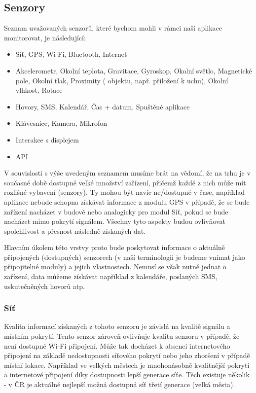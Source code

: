 \documentclass[thesis=M,czech]{FITthesis}[2012/06/26]
\begin{document}
\subsection{Senzory}
Seznam uvažovaných senzorů, které bychom mohli v rámci naší aplikace monitorovat, je následující:

\begin{itemize}
\item    Síť, GPS, Wi-Fi, Bluetooth, Internet
\item    Akcelerometr, Okolní teplota, Gravitace, Gyroskop, Okolní světlo, Magnetické pole, Okolní tlak, Proximity ( objektu, např. přiložení k uchu), Okolní vlhkost, Rotace
\item    Hovory, SMS, Kalendář, Čas + datum, Spuštěné aplikace
\item    Klávesnice, Kamera, Mikrofon
\item    Interakce s displejem
\item    API
\end{itemize}

V souvislosti s výše uvedeným seznamem musíme brát na vědomí, že na trhu je v současné době dostupné velké množství zařízení, přičemž každé z nich může mít rozlišné vybavení (senzory). Ty mohou být navíc ne/dostupné v čase, například aplikace nebude schopna získávat informace z modulu GPS v případě, že se bude zařízení nacházet v budově nebo analogicky pro modul Síť, pokud se bude nacházet mimo pokrytí signálem. Všechny tyto aspekty budou ovlivňovat spolehlivost a přesnost následně získaných dat.

Hlavním úkolem této vrstvy proto bude poskytovat informace o aktuálně připojených (dostupných) senzorech (v naší terminologii je budeme vnímat jako připojitelné moduly) a jejich vlastnostech. Nemusí se však nutně jednat o  zařízení, data můžeme získávat například z kalendáře, poslaných SMS, uskutečněných hovorů atp.

\subsubsection*{Síť}
Kvalita informací získaných z tohoto senzoru je závislá na kvalitě signálu a místním pokrytí. Tento senzor zároveň ovlivňuje kvalitu senzoru  v případě, že není dostupné Wi-Fi připojení. Může tak docházet k absenci internetového připojení na základě nedostupnosti síťového pokrytí nebo jeho zhoršení v případě místní lokace. Například ve velkých městech je mnohonásobně kvalitnější pokrytí a internetové připojení díky dostupnosti lepší generace síťe. Těch existuje několik - v ČR je aktuálně nejlepší možná dostupná síť třetí generace (velká města).
\end{document}
